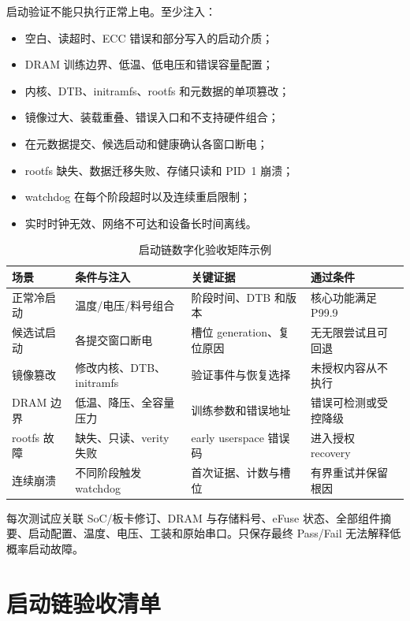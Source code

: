 启动验证不能只执行正常上电。至少注入：

\begin{itemize}
  \item 空白、读超时、ECC 错误和部分写入的启动介质；
  \item DRAM 训练边界、低温、低电压和错误容量配置；
  \item 内核、DTB、initramfs、rootfs 和元数据的单项篡改；
  \item 镜像过大、装载重叠、错误入口和不支持硬件组合；
  \item 在元数据提交、候选启动和健康确认各窗口断电；
  \item rootfs 缺失、数据迁移失败、存储只读和 PID~1 崩溃；
  \item watchdog 在每个阶段超时以及连续重启限制；
  \item 实时时钟无效、网络不可达和设备长时间离线。
\end{itemize}

\begin{table}[H]
  \centering
  \caption{启动链数字化验收矩阵示例}
  \begin{tabular}{p{27mm}p{42mm}p{39mm}p{32mm}}
    \hline
    场景 & 条件与注入 & 关键证据 & 通过条件 \\
    \hline
    正常冷启动 & 温度/电压/料号组合 & 阶段时间、DTB 和版本 & 核心功能满足 P99.9 \\
    候选试启动 & 各提交窗口断电 & 槽位 generation、复位原因 & 无无限尝试且可回退 \\
    镜像篡改 & 修改内核、DTB、initramfs & 验证事件与恢复选择 & 未授权内容从不执行 \\
    DRAM 边界 & 低温、降压、全容量压力 & 训练参数和错误地址 & 错误可检测或受控降级 \\
    rootfs 故障 & 缺失、只读、verity 失败 & early userspace 错误码 & 进入授权 recovery \\
    连续崩溃 & 不同阶段触发 watchdog & 首次证据、计数与槽位 & 有界重试并保留根因 \\
    \hline
  \end{tabular}
\end{table}

每次测试应关联 SoC/板卡修订、DRAM 与存储料号、eFuse 状态、全部组件摘要、启动配置、温度、电压、工装和原始串口。只保存最终 Pass/Fail 无法解释低概率启动故障。

\section{启动链验收清单}

